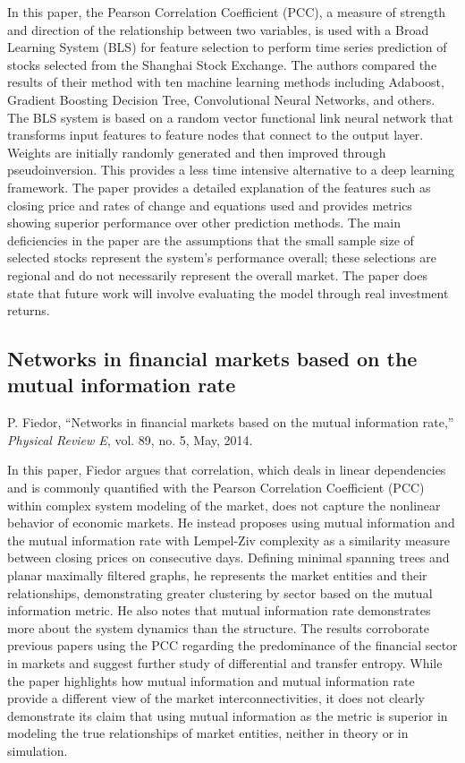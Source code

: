 \documentclass[12pt]{article}
\begin{document}
In this paper, the Pearson Correlation Coefficient (PCC), a measure of strength and direction of the relationship between two variables, is used with a Broad Learning System (BLS) for feature selection to perform time series prediction of stocks selected from the Shanghai Stock Exchange. The authors compared the results of their method with ten machine learning methods including Adaboost, Gradient Boosting Decision Tree, Convolutional Neural Networks, and others. The BLS system is based on a random vector functional link neural network that transforms input features to feature nodes that connect to the output layer. Weights are initially randomly generated and then improved through pseudoinversion. This provides a less time intensive alternative to a deep learning framework. The paper provides a detailed explanation of the features such as closing price and rates of change and equations used and provides metrics showing superior performance over other prediction methods. The main deficiencies in the paper are the assumptions that the small sample size of selected stocks represent the system's performance overall; these selections are regional and do not necessarily represent the overall market. The paper does state that future work will involve evaluating the model through real investment returns.


\subsection{Networks in financial markets based on the mutual information rate}
P. Fiedor, “Networks in financial markets based on the mutual information rate,” \textit{Physical Review E}, vol. 89, no. 5, May, 2014. %
\newline

In this paper, Fiedor argues that correlation, which deals in linear dependencies and is commonly quantified with the Pearson Correlation Coefficient (PCC) within complex system modeling of the market, does not capture the nonlinear behavior of economic markets. He instead proposes using mutual information and the mutual information rate with Lempel-Ziv complexity as a similarity measure between closing prices on consecutive days. Defining minimal spanning trees and planar maximally filtered graphs, he represents the market entities and their relationships, demonstrating greater clustering by sector based on the mutual information metric. He also notes that mutual information rate demonstrates more about the system dynamics than the structure. The results corroborate previous papers using the PCC regarding the predominance of the financial sector in markets and suggest further study of differential and transfer entropy. While the paper highlights how mutual information and mutual information rate provide a different view of the market interconnectivities, it does not clearly demonstrate its claim that using mutual information as the metric is superior in modeling the true relationships of market entities, neither in theory or in simulation.
\end{document}
